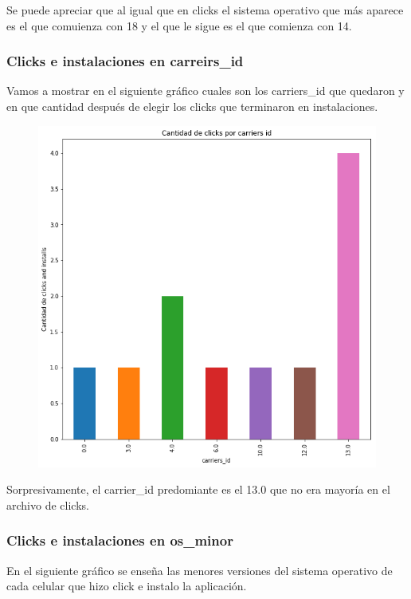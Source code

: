 \documentclass[a4paper, 12pt]{article}
\newcommand\tab[1][1cm]{\hspace*{#1}}
\begin{document}
{{	\tab Se puede apreciar que al igual que en clicks el sistema operativo que más aparece es el que comuienza con 18 y el que le sigue es el que comienza con 14.
	
	\subsubsection{Clicks e instalaciones en carreirs\_id}
	\tab Vamos a mostrar en el siguiente gráfico cuales son los carriers\_id que quedaron y en que cantidad después de elegir los clicks que terminaron en instalaciones.
	
	\FloatBarrier
		\begin{figure}[h]
			\centering
			\includegraphics[scale = 0.4]{images/clicks-installs/carrier_id.png}
			\caption{}
		\end{figure}
	\FloatBarrier

	\tab Sorpresivamente, el carrier\_id predomiante es el 13.0 que no era mayoría en el archivo de clicks.
	
	\subsubsection{Clicks e instalaciones en os\_minor}
	\tab En el siguiente gráfico se enseña las menores versiones del sistema operativo de cada celular que hizo click e instalo la aplicación.
	
}}
\end{document}
